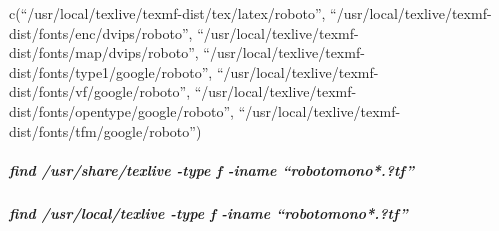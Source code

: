 \documentclass[
]{article}
\begin{document}
c(``/usr/local/texlive/texmf-dist/tex/latex/roboto'',
``/usr/local/texlive/texmf-dist/fonts/enc/dvips/roboto'',
``/usr/local/texlive/texmf-dist/fonts/map/dvips/roboto'',
``/usr/local/texlive/texmf-dist/fonts/type1/google/roboto'',
``/usr/local/texlive/texmf-dist/fonts/vf/google/roboto'',
``/usr/local/texlive/texmf-dist/fonts/opentype/google/roboto'',
``/usr/local/texlive/texmf-dist/fonts/tfm/google/roboto'')

\hypertarget{find-usrsharetexlive--type-f--iname-robotomono.tf}{%
\subparagraph{\texorpdfstring{find /usr/share/texlive -type f -iname
``\emph{roboto}mono*.?tf''}{find /usr/share/texlive -type f -iname ``robotomono*.?tf''}}\label{find-usrsharetexlive--type-f--iname-robotomono.tf}}

\hypertarget{find-usrlocaltexlive--type-f--iname-robotomono.tf}{%
\subparagraph{\texorpdfstring{find /usr/local/texlive -type f -iname
``\emph{roboto}mono*.?tf''}{find /usr/local/texlive -type f -iname ``robotomono*.?tf''}}\label{find-usrlocaltexlive--type-f--iname-robotomono.tf}}
\end{document}
